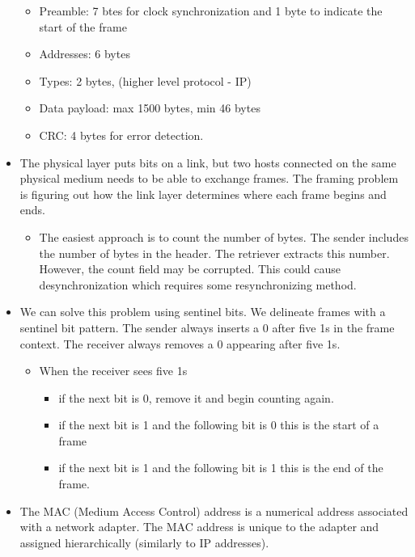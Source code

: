 \begin{itemize}
  \begin{itemize}
  \tightlist
  \item
    Preamble: 7 btes for clock synchronization and 1 byte to indicate
    the start of the frame
  \item
    Addresses: 6 bytes
  \item
    Types: 2 bytes, (higher level protocol - IP)
  \item
    Data payload: max 1500 bytes, min 46 bytes
  \item
    CRC: 4 bytes for error detection.
  \end{itemize}
\item
  The physical layer puts bits on a link, but two hosts connected on the
  same physical medium needs to be able to exchange frames. The framing
  problem is figuring out how the link layer determines where each frame
  begins and ends.

  \begin{itemize}
  \tightlist
  \item
    The easiest approach is to count the number of bytes. The sender
    includes the number of bytes in the header. The retriever extracts
    this number. However, the count field may be corrupted. This could
    cause desynchronization which requires some resynchronizing method.
  \end{itemize}
\item
  We can solve this problem using sentinel bits. We delineate frames
  with a sentinel bit pattern. The sender always inserts a 0 after five
  1s in the frame context. The receiver always removes a 0 appearing
  after five 1s.

  \begin{itemize}
  \tightlist
  \item
    When the receiver sees five 1s

    \begin{itemize}
    \tightlist
    \item
      if the next bit is 0, remove it and begin counting again.
    \item
      if the next bit is 1 and the following bit is 0 this is the start
      of a frame
    \item
      if the next bit is 1 and the following bit is 1 this is the end of
      the frame.
    \end{itemize}
  \end{itemize}
\item
  The MAC (Medium Access Control) address is a numerical address
  associated with a network adapter. The MAC address is unique to the
  adapter and assigned hierarchically (similarly to IP addresses).


\end{itemize}
